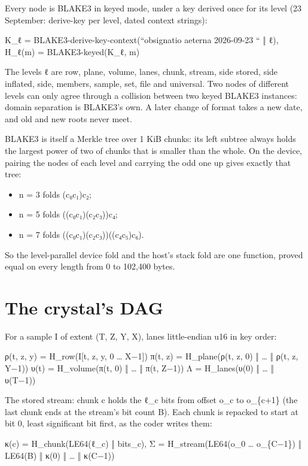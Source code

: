 Every node is BLAKE3 in keyed mode, under a key derived once for its level (23 September: derive-key per level, dated context strings):

K\_\allowbreak{}ℓ = BLAKE3-derive-key-context(“obsignatio aeterna 2026-09-23 “ ‖ ℓ),  H\_\allowbreak{}ℓ(m) = BLAKE3-keyed(K\_\allowbreak{}ℓ, m)

The levels ℓ are row, plane, volume, lanes, chunk, stream, side stored, side inflated, side, members, sample, set, file and universal. Two nodes of different levels can only agree through a collision between two keyed BLAKE3 instances: domain separation is BLAKE3's own. A later change of format takes a new date, and old and new roots never meet.

BLAKE3 is itself a Merkle tree over 1 KiB chunks: its left subtree always holds the largest power of two of chunks that is smaller than the whole. On the device, pairing the nodes of each level and carrying the odd one up gives exactly that tree:

\begin{itemize}
\item n = 3 folds (c₀c₁)c₂;
\item n = 5 folds ((c₀c₁)(c₂c₃))c₄;
\item n = 7 folds ((c₀c₁)(c₂c₃))((c₄c₅)c₆).
\end{itemize}

So the level-parallel device fold and the host's stack fold are one function, proved equal on every length from 0 to 102,400 bytes.

\section{\texorpdfstring{The crystal's DAG}{The crystal's DAG}}

For a sample I of extent (T, Z, Y, X), lanes little-endian u16 in key order:

ρ(t, z, y) = H\_\allowbreak{}row(I[t, z, y, 0 … X−1]) π(t, z) = H\_\allowbreak{}plane(ρ(t, z, 0) ‖ … ‖ ρ(t, z, Y−1)) υ(t) = H\_\allowbreak{}volume(π(t, 0) ‖ … ‖ π(t, Z−1)) Λ = H\_\allowbreak{}lanes(υ(0) ‖ … ‖ υ(T−1))

The stored stream: chunk c holds the ℓ\_\allowbreak{}c bits from offset o\_\allowbreak{}c to o\_\allowbreak{}\{c+1\} (the last chunk ends at the stream's bit count B). Each chunk is repacked to start at bit 0, least significant bit first, as the coder writes them:

κ(c) = H\_\allowbreak{}chunk(LE64(ℓ\_\allowbreak{}c) ‖ bits\_\allowbreak{}c),  Σ = H\_\allowbreak{}stream(LE64(o\_\allowbreak{}0 … o\_\allowbreak{}\{C−1\}) ‖ LE64(B) ‖ κ(0) ‖ … ‖ κ(C−1))

